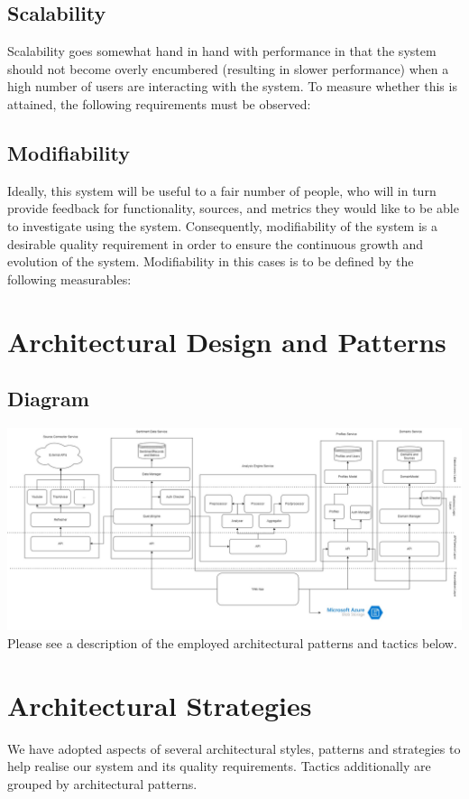 \documentclass[12pt]{article}
\begin{document}
\subsection{Scalability}
Scalability goes somewhat hand in hand with performance in that the system should not become overly encumbered (resulting in slower performance) when a high number of users are interacting with the system. To measure whether this is attained, the following requirements must be observed:

\subsection{Modifiability}
Ideally, this system will be useful to a fair number of people, who will in turn provide feedback for functionality, sources, and metrics they would like to be able to investigate using the system. Consequently, modifiability of the system is a desirable quality requirement in order to ensure the continuous growth and evolution of the system. Modifiability in this cases is to be defined by the following measurables:


\newpage
\section{Architectural Design and Patterns}
\subsection{Diagram}
\includegraphics[width=1\textwidth]{Demo3Architecture.jpg}
Please see a description of the employed architectural patterns and tactics below.


\newpage
\section{Architectural Strategies}
We have adopted aspects of several architectural styles, patterns and strategies to help realise our system and its quality requirements. Tactics additionally are grouped by architectural patterns.
\end{document}

